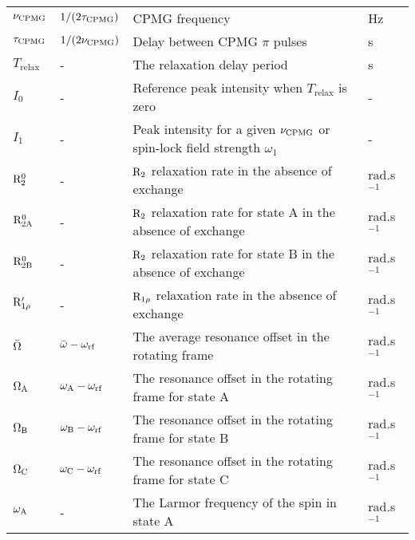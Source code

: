 \begin{landscape}
\begin{center}
\begin{small}
\begin{longtable}{llll}
$\nu_\textrm{CPMG}$          & $1 / (2 \tau_\textrm{CPMG})$             & CPMG frequency                                                                & Hz \\
$\tau_\textrm{CPMG}$         & $1 / (2 \nu_\textrm{CPMG})$              & Delay between CPMG $\pi$ pulses                                               & s \\
$T_\textrm{relax}$ & -                              & The relaxation delay period                                                   & s \\
$I_0$              & -                              & Reference peak intensity when $T_\textrm{relax}$ is zero                      & - \\
$I_1$              & -                              & Peak intensity for a given $\nu_\textrm{CPMG}$ or spin-lock field strength $\omega_1$   & - \\
$\mathrm{R}_2^0$        & -                              & $\mathrm{R}_2$ relaxation rate in the absence of exchange                            & rad.s$^{-1}$ \\
$\mathrm{R}_\mathrm{2A}^0$       & -                              & $\mathrm{R}_2$ relaxation rate for state A in the absence of exchange                & rad.s$^{-1}$ \\
$\mathrm{R}_\mathrm{2B}^0$       & -                              & $\mathrm{R}_2$ relaxation rate for state B in the absence of exchange                & rad.s$^{-1}$ \\
$\mathrm{R}_{1\rho}'$    & -                              & $\mathrm{R}_{1\rho}$ relaxation rate in the absence of exchange                         & rad.s$^{-1}$ \\
$\bar\Omega$       & $\bar\omega - \omega_\textrm{rf}$         & The average resonance offset in the rotating frame                            & rad.s$^{-1}$ \\
$\Omega_\textrm{A}$         & $\omega_\textrm{A} - \omega_\textrm{rf}$           & The resonance offset in the rotating frame for state A                        & rad.s$^{-1}$ \\
$\Omega_\textrm{B}$         & $\omega_\textrm{B} - \omega_\textrm{rf}$           & The resonance offset in the rotating frame for state B                        & rad.s$^{-1}$ \\
$\Omega_\textrm{C}$         & $\omega_\textrm{C} - \omega_\textrm{rf}$           & The resonance offset in the rotating frame for state C                        & rad.s$^{-1}$ \\
$\omega_\textrm{A}$          & -                              & The Larmor frequency of the spin in state A                                   & rad.s$^{-1}$ \\

\end{longtable}
\end{small}
\end{center}
\end{landscape}
